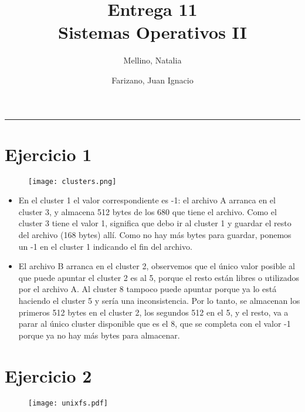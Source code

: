\documentclass[11pt]{article}
\title{
    Entrega 11 \\
    \large Sistemas Operativos II}
\author{Mellino, Natalia \and Farizano, Juan Ignacio}
\date{}
\begin{document}
\maketitle

\noindent\rule{\textwidth}{1pt}

\section*{Ejercicio 1}

\begin{figure}[h!]
  \begin{center}
    \texttt{[image: clusters.png]}
  \end{center}
\end{figure}
\begin{itemize}
    \item En el cluster 1 el valor correspondiente es -1: el archivo A arranca
          en el cluster 3, y almacena 512 bytes de los 680 que tiene el archivo.
          Como el cluster 3 tiene el valor 1, significa que debo ir al cluster 1
          y guardar el resto del archivo (168 bytes) allí. Como no hay más bytes
          para guardar, ponemos un -1 en el cluster 1 indicando el fin del archivo.
    \item El archivo B arranca en el cluster 2, observemos que el único valor posible
          al que puede apuntar el cluster 2 es al 5, porque el resto están libres
          o utilizados por el archivo A. Al cluster 8 tampoco puede apuntar porque
          ya lo está haciendo el cluster 5 y sería una inconsistencia. Por lo tanto,
          se almacenan los primeros 512 bytes en el cluster 2, los segundos 512 en el
          5, y el resto, va a parar al único cluster disponible que es el 8, que se 
          completa con el valor -1 porque ya no hay más bytes para almacenar.
\end{itemize}

\section*{Ejercicio 2}

\begin{figure}[h!]
  \begin{center}
    \texttt{[image: unixfs.pdf]}
  \end{center}
\end{figure}
\end{document}
